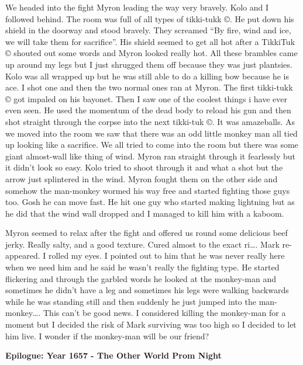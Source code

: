 \begin{multicols}{2}
We headed into the fight Myron leading the way very bravely. Kolo and I followed behind. The room was full of all types of tikki-tukk ©. He put down his shield in the doorway and stood bravely. They screamed “By fire, wind and ice, we will take them for sacrifice”. His shield seemed to get all hot after a TikkiTuk © shouted out some words and Myron looked really hot. All these brambles came up around my legs but I just shrugged them off because they was just plantsies. Kolo was all wrapped up but he was still able to do a killing bow because he is ace. I shot one and then the two normal ones ran at Myron. The first tikki-tukk © got impaled on his bayonet. Then I saw one of the coolest things i have ever even seen. He used the momentum of the dead body to reload his gun and then shot straight through the corpse into the next tikki-tuk ©. It was amazeballs. As we moved into the room we saw that there was an odd little monkey man all tied up looking like a sacrifice. We all tried to come into the room but there was some giant almost-wall like thing of wind. Myron ran straight through it fearlessly but it didn’t look so easy. Kolo tried to shoot through it and what a shot but the arrow just splintered in the wind. Myron fought them on the other side and somehow the man-monkey wormed his way free and started fighting those guys too. Gosh he can move fast. He hit one guy who started making lightning but as he did that the wind wall dropped and I managed to kill him with a kaboom.\medskip

Myron seemed to relax after the fight and offered us round some delicious beef jerky. Really salty, and a good texture. Cured almost to the exact ri…. Mark re-appeared. I rolled my eyes. I pointed out to him that he was never really here when we need him and he said he wasn’t really the fighting type. He started flickering and through the garbled words he looked at the monkey-man and sometimes he didn’t have a leg and sometimes his legs were walking backwards while he was standing still and then suddenly he just jumped into the man-monkey…. This can’t be good news. I considered killing the monkey-man for a moment but I decided the risk of Mark surviving was too high so I decided to let him live. I wonder if the monkey-man will be our friend?\medskip

\textbf{Epilogue: Year 1657 - The Other World Prom Night}\medskip


\end{multicols}
